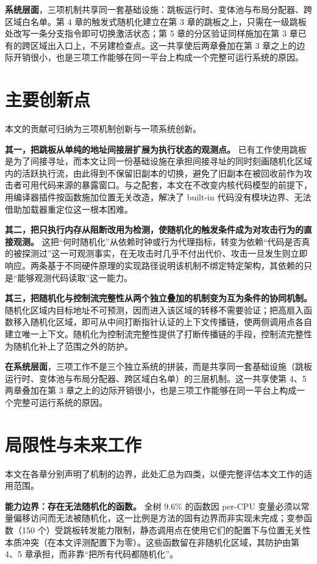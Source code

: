 \textbf{系统层面}，三项机制共享同一套基础设施：跳板运行时、变体池与布局分配器、跨区域白名单。第 4 章的触发式随机化建立在第 3 章的跳板之上，只需在一级跳板处改写一条分支指令即可切换激活状态；第 5 章的分区验证同样施加在第 3 章已有的跨区域出入口上，不另建检查点。这一共享使后两章叠加在第 3 章之上的边际开销很小，也是三项工作能够在同一平台上构成一个完整可运行系统的原因。

\section{主要创新点}

本文的贡献可归纳为三项机制创新与一项系统创新。

\textbf{其一，把跳板从单纯的地址间接层扩展为执行状态的观测点。} 已有工作使用跳板是为了间接寻址，而本文让同一份基础设施在承担间接寻址的同时刻画随机化区域内的活跃执行流，由此得到不保留旧副本的切换，避免了旧副本在被回收前作为攻击者可用代码来源的暴露窗口。与之配套，本文在不改变内核代码模型的前提下，用编译器插件按函数施加位置无关改造，解决了 built-in 代码没有模块边界、无法借助加载器重定位这一根本困难。

\textbf{其二，把只执行内存从阻断改用为检测，使随机化的触发条件成为对攻击行为的直接观测。} 这把“何时随机化”从依赖时钟或行为代理指标，转变为依赖“代码是否真的被探测过”这一可观测事实，在无攻击时几乎不付出代价、攻击一旦发生则立即响应。两条基于不同硬件原理的实现路径说明该机制不绑定特定架构，其依赖的只是“能够观测代码读取”这一能力。

\textbf{其三，把随机化与控制流完整性从两个独立叠加的机制变为互为条件的协同机制。} 随机化区域内目标地址不可预测，因而进入该区域的转移不需要验证；把高扇入函数移入随机化区域，即可从中间打断指针认证的上下文传播链，使两侧调用点各自建立唯一上下文。随机化为控制流完整性提供了打断传播链的手段，控制流完整性为随机化补上了范围之外的防护。

\textbf{在系统层面}，三项工作不是三个独立系统的拼装，而是共享同一套基础设施（跳板运行时、变体池与布局分配器、跨区域白名单）的三层机制。这一共享使第 4、5 两章叠加在第 3 章之上的边际开销很小，也是三项工作能够在同一平台上构成一个完整可运行系统的原因。

\section{局限性与未来工作}

本文在各章分别声明了机制的边界，此处汇总为四类，以便完整评估本文工作的适用范围。

\textbf{能力边界：存在无法随机化的函数。} 全树 9.6\% 的函数因 per-CPU 变量必须以常量偏移访问而无法被随机化，这一比例是方法的固有边界而非实现未完成；变参函数（150 个）受跳板转发能力限制，静态调用点在使用它们的配置下与位置无关性本质冲突（在本文评测配置下为零）。这些函数留在非随机化区域，其防护由第 4、5 章承担，而非靠“把所有代码都随机化”。

